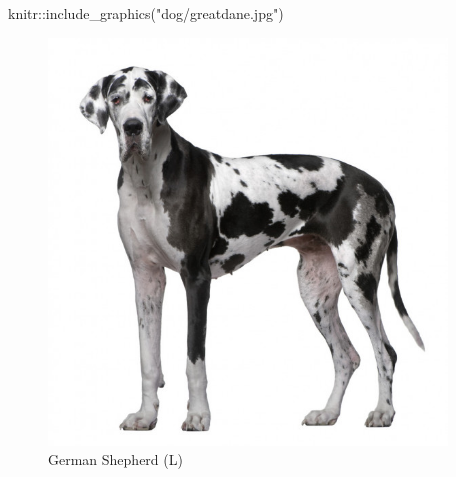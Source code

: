 \documentclass[
]{article}
\newenvironment{Shaded}{\begin{snugshade}}{\end{snugshade}}
\newcommand{\FunctionTok}[1]{\textcolor[rgb]{0.00,0.00,0.00}{#1}}
\newcommand{\NormalTok}[1]{#1}
\newcommand{\SpecialCharTok}[1]{\textcolor[rgb]{0.00,0.00,0.00}{#1}}
\newcommand{\StringTok}[1]{\textcolor[rgb]{0.31,0.60,0.02}{#1}}
\begin{document}
\begin{Shaded}
\begin{Highlighting}[]
\NormalTok{knitr}\SpecialCharTok{::}\FunctionTok{include\_graphics}\NormalTok{(}\StringTok{"dog/greatdane.jpg"}\NormalTok{)}
\end{Highlighting}
\end{Shaded}

\begin{figure}
\includegraphics[width=400px]{dog/greatdane} \caption{German Shepherd (L)}\label{fig:unnamed-chunk-2-5}
\end{figure}
\end{document}
